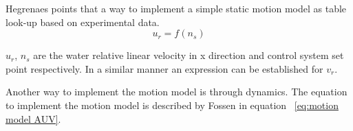 \documentclass[12pt]{dalcsthesis}
\begin{document}
Hegrenaes \cite{Hallingstad2007} points that a way to implement a simple static motion model as table look-up based on experimental data. 
\begin{equation}
\label{eq:static AUV model}
u_{r}=f(n_{s})
\end{equation}


$u_{r}$, $n_{s}$ are the water relative linear velocity in x direction and control system set point respectively. In a similar manner an expression can be established for $v_{r}$.

Another way to implement the motion model is through dynamics. The equation to implement the motion model is described by Fossen \cite{Thor} in equation ~\ref{eq:motion model AUV}.

\end{document}
